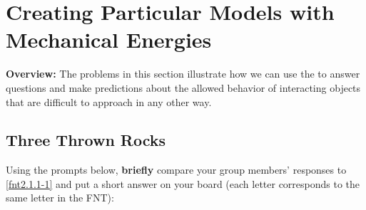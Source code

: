 \section{Creating Particular Models with Mechanical Energies}
\label{act2.1.3}

\begin{overview}

\noindent\textbf{Overview:} The problems in this section illustrate how we can use the \EnergyInteractionModel{} to answer questions and make predictions about the allowed behavior of interacting objects that are difficult to approach in any other way.
	
\end{overview}


\subsection{Three Thrown Rocks}
\label{act2.1.3a}

\begin{fnt}
	
\end{fnt}


\noindent Using the prompts below, \textbf{briefly} compare your group members' responses to \ref{fnt2.1.1-1} and put a short answer on your board (each letter corresponds to the same letter in the FNT):

